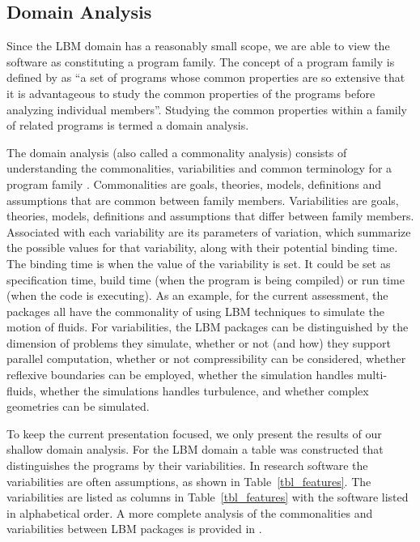\documentclass[final, 3p, times, authoryear]{elsarticle}
\begin{document}
\subsection{Domain Analysis} \label{SecDomainAnalysis}

Since the LBM domain has a reasonably small scope, we are able to view the
software as constituting a program family.  The concept of a program family is
defined by \citet{parnas1976design} as ``a set of programs whose common
properties are so extensive that it is advantageous to study the common
properties of the programs before analyzing individual members''. Studying the
common properties within a family of related programs is termed a domain
analysis.

The domain analysis (also called a commonality analysis) consists of
understanding the commonalities, variabilities and common terminology for a
program family \citep{weiss1997defining}. Commonalities are goals, theories,
models, definitions and assumptions that are common between family members.
Variabilities are goals, theories, models, definitions and assumptions that
differ between family members. Associated with each variability are its
parameters of variation, which summarize the possible values for that
variability, along with their potential binding time.  The binding time is when
the value of the variability is set.  It could be set as specification time,
build time (when the program is being compiled) or run time (when the code is
executing). As an example, for the current assessment, the packages all have the
commonality of using LBM techniques to simulate the motion of fluids.  For
variabilities, the LBM packages can be distinguished by the dimension of
problems they simulate, whether or not (and how) they support parallel
computation, whether or not compressibility can be considered, whether reflexive
boundaries can be employed, whether the simulation handles multi-fluids, whether
the simulations handles turbulence, and whether complex geometries can be
simulated.

To keep the current presentation focused, we only present the results of our
shallow domain analysis. For the LBM domain a table was constructed that
distinguishes the programs by their variabilities.  In research software the
variabilities are often assumptions, as shown in Table~\ref{tbl_features}. The
variabilities are listed as columns in Table~\ref{tbl_features} with the
software listed in alphabetical order. A more complete analysis of the
commonalities and variabilities between LBM packages is provided in
\citet{Michalski2021}.
\end{document}
